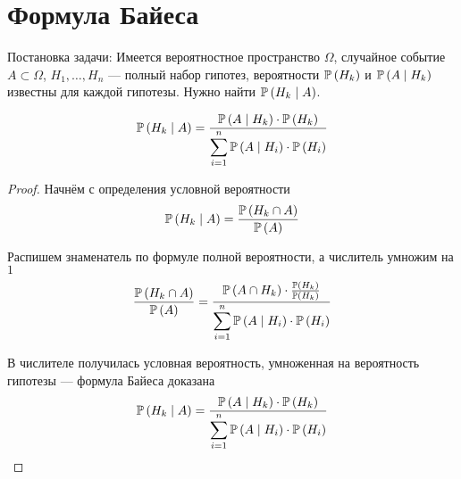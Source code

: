 \section{Формула Байеса}
Постановка задачи: Имеется вероятностное пространство $\Omega$,
случайное событие $A\subset\Omega$,
$H_1,\dots,H_n$ --- полный набор гипотез,
вероятности $\mathbb{P}\left( H_k \right)$ и $\mathbb{P}\left( A\mid H_k \right)$ известны
для каждой гипотезы. Нужно найти $\mathbb{P}\left( H_k\mid A \right)$.
\begin{lemma}
    $$\mathbb{P}\left( H_k\mid A \right)
    =\frac{\mathbb{P}\left( A\mid H_k \right)\cdot\mathbb{P}\left( H_k \right)}
    {\displaystyle\sum_{i=1}^n \mathbb{P}\left( A\mid H_i \right)\cdot\mathbb{P}\left( H_i \right)}
    $$
\end{lemma}
\begin{proof}
    Начнём с определения условной вероятности
    $$\mathbb{P}\left( H_k\mid A \right)
    =\frac{\mathbb{P}\left( H_k\cap A \right)}{\mathbb{P}\left( A \right)}
    $$
    
    Распишем знаменатель по формуле полной вероятности,
    а числитель умножим на $1$
    $$
    \frac{\mathbb{P}\left( H_k\cap A \right)}{\mathbb{P}\left( A \right)}
    =\frac{\mathbb{P}\left( A\cap H_k \right)\cdot
    \frac{\mathbb{P}\left( H_k \right)}{\mathbb{P}\left( H_k \right)}}
    {\displaystyle\sum_{i=1}^n \mathbb{P}\left( A\mid H_i \right)\cdot\mathbb{P}\left( H_i \right)}
    $$

    В числителе получилась условная вероятность,
    умноженная на вероятность гипотезы --- формула Байеса доказана
    $$\mathbb{P}\left( H_k\mid A \right)
    =\frac{\mathbb{P}\left( A\mid H_k \right)\cdot\mathbb{P}\left( H_k \right)}
    {\displaystyle\sum_{i=1}^n \mathbb{P}\left( A\mid H_i \right)\cdot\mathbb{P}\left( H_i \right)}
    $$
\end{proof}

